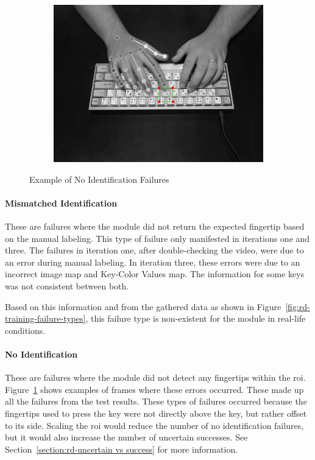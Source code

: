 \documentclass[preprint,12pt,authoryear]{elsarticle}
\begin{document}
\begin{figure}[h]
\begin{subfigure}{.33\textwidth}
		\includegraphics[width=.995\linewidth]{failure-2.png}
	\end{subfigure}
	\caption{Example of No Identification Failures}
	\label{fig:rd-training-sample}
\end{figure}

\paragraph{Mismatched Identification}
These are failures where the module did not return the expected fingertip based
on the manual labeling. This type of failure only manifested in iterations one
and three. The failures in iteration one, after double-checking the video, were
due to an error during manual labeling. In iteration three, these errors were
due to an incorrect image map and Key-Color Values map. The information for some
keys was not consistent between both.

Based on this information and from the gathered data as shown in
Figure~\ref{fig:rd-training-failure-types}, this failure type is non-existent
for the module in real-life conditions.

\paragraph{No Identification}
These are failures where the module did not detect any fingertips within the
\ac{roi}. Figure~\ref{fig:rd-training-sample} shows examples of frames where
these errors occurred. These made up all the failures from the test results.
These types of failures occurred because the fingertips used to press the key
were not directly above the key, but rather offset to its side. Scaling the
\ac{roi} would reduce the number of no identification failures, but it would
also increase the number of uncertain successes. See
Section~\ref{section:rd-uncertain vs success} for more information.
\end{document}
